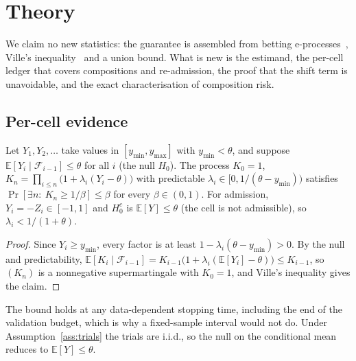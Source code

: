 \section{Theory}
\label{sec:theory}

We claim no new statistics: the guarantee is assembled from betting e-processes~\cite{waudbysmith2024betting},
Ville's inequality~\cite{ville1939} and a union bound.  What is new is the estimand, the per-cell ledger that covers
compositions and re-admission, the proof that the shift term is unavoidable, and the exact characterisation of composition
risk.

\subsection{Per-cell evidence}

\begin{lemma}\label{lem:eprocess}
Let $Y_1,Y_2,\dots$ take values in $[y_{\min},y_{\max}]$ with $y_{\min}<\theta$, and suppose
$\mathbb{E}[Y_i\mid\mathcal{F}_{i-1}]\le\theta$ for all $i$ (the null $H_0$).  The process $K_0=1$,
$K_n=\prod_{i\le n}\bigl(1+\lambda_i(Y_i-\theta)\bigr)$ with predictable $\lambda_i\in[0,1/(\theta-y_{\min}))$ satisfies
$\Pr[\exists n:\ K_n\ge 1/\beta]\le\beta$ for every $\beta\in(0,1)$.  For admission, $Y_i=-Z_i\in[-1,1]$ and $H_0^c$ is
$\mathbb{E}[Y]\le\theta$ (the cell is not admissible), so $\lambda_i<1/(1+\theta)$.
\end{lemma}

\begin{proof}
Since $Y_i\ge y_{\min}$, every factor is at least $1-\lambda_i(\theta-y_{\min})>0$.  By the null and predictability,
$\mathbb{E}[K_i\mid\mathcal{F}_{i-1}]=K_{i-1}\bigl(1+\lambda_i(\mathbb{E}[Y_i]-\theta)\bigr)\le K_{i-1}$, so $(K_n)$ is a
nonnegative supermartingale with $K_0=1$, and Ville's inequality gives the claim.
\end{proof}

The bound holds at any data-dependent stopping time, including the end of the validation budget, which is why a fixed-sample
interval would not do.  Under Assumption~\ref{ass:trials} the trials are i.i.d., so the null on the conditional mean reduces to
$\mathbb{E}[Y]\le\theta$.

